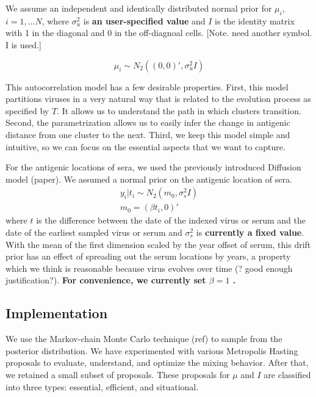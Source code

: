 \documentclass[11pt,oneside,letterpaper]{article}
\newcommand{\drift}{\beta}							%
\begin{document}
We assume an independent and identically distributed normal prior for $\mu_i$, $i=1,...N$, where $\sigma^2_u$ is \textbf{an user-specified value} and $I$ is the identity matrix with 1 in the diagonal and 0 in the off-diagnoal cells. [Note. need another symbol. I is used.]

\begin{equation}
   \mu_i  \sim N_2 ( (0,0)' , \sigma^2_u I) 
\end{equation}


This autocorrelation model has a few desirable properties.
First, this model partitions viruses in a very natural way that is related to the evolution process as specified by $T$.
It allows us to understand the path in which clusters transition.
Second, the parametrization allows us to easily infer the change in antigenic distance from one cluster to the next.
Third, we keep this model simple and intuitive, so we can focus on the essential aspects that we want to capture.



For the antigenic locations of sera, we used the previously introduced Diffusion model  (paper). We assumed a normal prior on the antigenic location of sera.
\begin{eqnarray}
	y_i | t_i \sim N_2 ( m_0, \sigma^2_s I)  \\
	m_0 = ( \drift t_i ,0)' \nonumber
\end{eqnarray}
where $t$ is the difference between the date of the indexed virus or serum and the date of the earliest sampled virus or serum and $\sigma^2_s$ is \textbf{currently a fixed value}. 
With the mean of the first dimension scaled by the year offset of serum, this drift prior has an effect of spreading out the serum locations by years, a property which we think is reasonable because virus evolves over time (? good enough justification?). 
\textbf{For convenience, we currently set $\beta  = 1$ .}


\subsection*{Implementation}


We use the Markov-chain Monte Carlo technique (ref) to sample from the posterior distribution.
We have experimented with various Metropolis Hasting proposals to evaluate, understand, and optimize the mixing behavior. 
After that, we retained a small subset of proposals.
These proposals for $\mu$ and $I$ are classified into three types: essential, efficient, and situational. 
\end{document}
